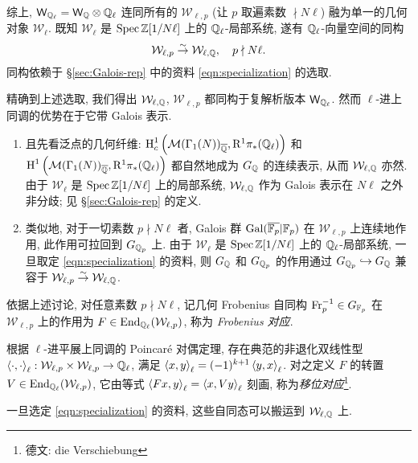 综上, $\mathsf{W}_{\mathbb{Q}_\ell} = \mathsf{W}_{\mathbb{Q}} \otimes \mathbb{Q}_\ell$ 连同所有的 $\mathcal{W}_{\ell, p}$ (让 $p$ 取遍素数 $\nmid N\ell$) 融为单一的几何对象 $\mathcal{W}_\ell$. 既知 $\mathcal{W}_\ell$ 是 $\operatorname{Spec} \mathbb{Z}[1/N\ell]$ 上的 $\mathbb{Q}_\ell$-局部系统, 遂有 $\mathbb{Q}_\ell$-向量空间的同构
\begin{equation}\label{eqn:W-isom}
	\mathcal{W}_{\ell, p} \stackrel{\sim}{\rightarrow} \mathcal{W}_{\ell, \mathbb{Q}}, \quad p \nmid N\ell.
\end{equation}
同构依赖于 \S\ref{sec:Galois-rep} 中的资料 \eqref{eqn:specialization} 的选取.

精确到上述选取, 我们得出 $\mathcal{W}_{\ell, \mathbb{Q}}$, $\mathcal{W}_{\ell, p}$ 都同构于复解析版本 $\mathsf{W}_{\mathbb{Q}_\ell}$. 然而 $\ell$-进上同调的优势在于它带 Galois 表示.
\begin{enumerate}
	\item 且先看泛点的几何纤维: $\operatorname{H}^1_c\left(\mathcal{M}(\Gamma_1(N))_{\overline{\mathbb{Q}}}, \mathrm{R}^1 \pi_* (\mathbb{Q}_\ell)\right)$ 和 $\operatorname{H}^1\left(\mathcal{M}(\Gamma_1(N))_{\overline{\mathbb{Q}}}, \mathrm{R}^1 \pi_* (\mathbb{Q}_\ell)\right)$ 都自然地成为 $G_{\mathbb{Q}}$ 的连续表示, 从而 $\mathcal{W}_{\ell, \mathbb{Q}}$ 亦然. 由于 $\mathcal{W}_\ell$ 是 $\operatorname{Spec} \mathbb{Z}[1/N\ell]$ 上的局部系统, $\mathcal{W}_{\ell, \mathbb{Q}}$ 作为 Galois 表示在 $N\ell$ 之外非分歧; 见 \S\ref{sec:Galois-rep} 的定义.
	\item 类似地, 对于一切素数 $p \nmid N\ell$ 者, Galois 群 $\operatorname{Gal}(\overline{\mathbb{F}_p}|\mathbb{F}_p)$ 在 $\mathcal{W}_{\ell, p}$ 上连续地作用, 此作用可拉回到 $G_{\mathbb{Q}_p}$ 上. 由于 $\mathcal{W}_\ell$ 是 $\operatorname{Spec}\mathbb{Z}[1/N\ell]$ 上的 $\mathbb{Q}_\ell$-局部系统, 一旦取定 \eqref{eqn:specialization} 的资料, 则 $G_{\mathbb{Q}}$ 和 $G_{\mathbb{Q}_p}$ 的作用通过 $G_{\mathbb{Q}_p} \hookrightarrow G_{\mathbb{Q}}$ 兼容于 $\mathcal{W}_{\ell, p} \stackrel{\sim}{\rightarrow} \mathcal{W}_{\ell, \mathbb{Q}}$.
\end{enumerate}

\begin{definition}\label{def:FV}
	依据上述讨论, 对任意素数 $p \nmid N\ell$, 记几何 Frobenius 自同构 $\operatorname{Fr}_p^{-1} \in G_{\mathbb{F}_p}$ 在 $\mathcal{W}_{\ell, p}$ 上的作用为 $F \in \operatorname{End}_{\mathbb{Q}_\ell}(\mathcal{W}_{\ell, p})$, 称为 \emph{Frobenius 对应}.
	
	根据 $\ell$-进平展上同调的 Poincaré 对偶定理, 存在典范的非退化双线性型 $\left\langle \cdot, \cdot \right\rangle_\ell: \mathcal{W}_{\ell, p} \times \mathcal{W}_{\ell, p} \to \mathbb{Q}_\ell$, 满足 $\left\langle x, y \right\rangle_\ell = (-1)^{k+1} \left\langle y, x \right\rangle_\ell$. 对之定义 $F$ 的转置 $V \in \operatorname{End}_{\mathbb{Q}_\ell}(\mathcal{W}_{\ell, p})$, 它由等式 $\left\langle Fx, y \right\rangle_\ell = \left\langle x, Vy \right\rangle_\ell$ 刻画, 称为\emph{移位对应}\footnote{德文: die Verschiebung}.
	
	一旦选定 \eqref{eqn:specialization} 的资料, 这些自同态可以搬运到 $\mathcal{W}_{\ell, \mathbb{Q}}$ 上.
\end{definition}

